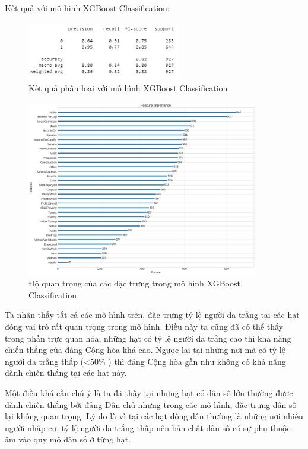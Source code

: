 \documentclass[14pt, a4paper]{article}
\numberwithin{equation}{section}
\numberwithin{figure}{section}
\numberwithin{dl}{section}
\numberwithin{md}{section}
\numberwithin{bd}{section}
\numberwithin{dn}{section}
\numberwithin{hq}{section}
\begin{document}
    Kết quả với mô hình XGBoost Classification:

    \begin{figure}[h!]
        \centering
        \includegraphics[width=0.6\textwidth]{figures/XGBoost_Classifier_Report.png}
        \caption{Kết quả phân loại với mô hình XGBoost Classification}
    \end{figure}

    \begin{figure}[h!]
        \centering
        \includegraphics[width=0.9\textwidth]{figures/XGBoost_Regression_Feature_Importance.png}
        \caption{Độ quan trọng của các đặc trưng trong mô hình XGBoost Classification}
    \end{figure}


    Ta nhận thấy tất cả các mô hình trên, đặc trưng tỷ lệ người da trắng tại các hạt đóng vai trò rất quan trọng trong mô hình.
    Điều này ta cũng đã có thể thấy trong phần trực quan hóa, những hạt có tỷ lệ người da trắng cao thì khả năng chiến thắng của đảng Cộng hòa khá cao.
    Ngược lại tại những nơi mà có tỷ lệ người da trắng thấp (<50\% ) thì đảng Cộng hòa gần như không có khả năng dành chiến thắng tại các hạt này.

    Một điều khá cần chú ý là ta đã thấy tại những hạt có dân số lớn thường được dành chiến thắng bởi đảng Dân chủ nhưng trong các mô hình, đặc trưng dân số lại không quan trọng.
    Lý do là vì tại các hạt đông dân thường là những nơi nhiều người nhập cư, tỷ lệ người da trắng thấp nên bản chất dân số có sự phụ thuộc âm vào quy mô dân số ở từng hạt.
\end{document}
